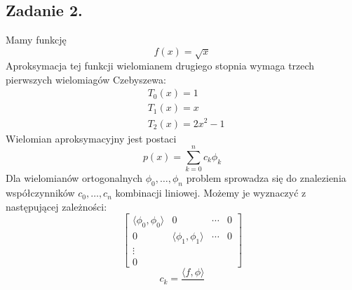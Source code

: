 \documentclass[11pt]{scrartcl}
\begin{document}
    \subsection{Zadanie 2.}
    Mamy funkcję
    \[
        f(x)=\sqrt{x}
    \]
    Aproksymacja tej funkcji wielomianem drugiego stopnia
    wymaga trzech pierwszych wielomiagów Czebyszewa:
    \begin{align*}
        & T_0(x) = 1 \\
        & T_1(x) = x \\
        & T_2(x) = 2x^2-1
    \end{align*}
    Wielomian aproksymacyjny jest postaci
    \[
        p(x)=\sum_{k=0}^{n}c_k\phi_k
    \]
    Dla wielomianów ortogonalnych $\phi_0,\ldots,\phi_n$
    problem sprowadza się do znalezienia współczynników
    $c_0,\ldots,c_n$ kombinacji liniowej. Możemy je wyznaczyć
    z następującej zależności:
    \[
        \begin{bmatrix}
            \langle \phi_0,\phi_0 \rangle & 0 & \cdots & 0 \\
            0 & \langle \phi_1,\phi_1 \rangle & \cdots & 0 \\
            \vdots \\
            0
        \end{bmatrix}
    \]
    \[
        c_k=\frac{\langle f,\phi \rangle}{}
    \]
\end{document}
